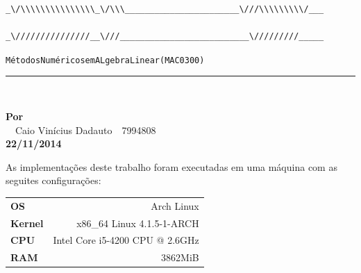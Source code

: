 \documentclass [a4paper,10pt]{article}
\newcommand{\n}[1]{\textbf{#1}}
\begin{document}
{\begin{Verbatim}[fontsize=\small]
       _\/\\\\\\\\\\\\\\\_\/\\\_______________________\///\\\\\\\\\/___ 
        _\///////////////__\///__________________________\/////////_____
    \end{Verbatim}
    \begin{alltt}
        \hspace{1cm} Métodos Numéricos em ALgebra Linear (MAC0300)
    \end{alltt}
    \vspace{-3mm}
    \rule{\textwidth}{2pt}\\[-6mm]

    \begin{center}
        \n{Por}\\[-0.5mm]
        $\quad${\small Caio Vinícius Dadauto$\quad$7994808}\\[-2mm]
        {\tiny \n{22/11/2014}}\\[4mm]
    \end{center}

    \vspace{2.8cm}

    As implementações deste trabalho foram executadas em uma máquina com as seguites configurações:\\
    {\linespread{1}
        \begin{tabular}{l r}    
            \hspace{2.5cm}\n{\small OS}      & \small Arch Linux\\
            \hspace{2.5cm}\n{\small Kernel}  & \small x86\_64 Linux 4.1.5-1-ARCH\\
            \hspace{2.5cm}\n{\small CPU}     & \small Intel Core i5-4200 CPU @ 2.6GHz\\
            \hspace{2.5cm}\n{\small RAM}     & \small 3862MiB
        \end{tabular}
    }

}
\end{document}
